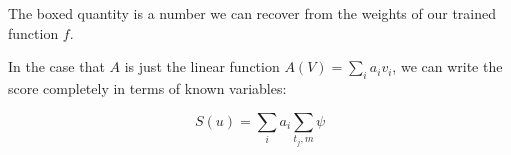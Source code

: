 \documentclass[paper.tex]{subfiles}
\begin{document}
	The boxed quantity is a number we can recover from the weights of our trained function $f$. 
	
	In the case that $A$ is just the linear function $A(V) = \sum_i a_i v_i$, we can write the score completely in terms of known variables:
	
	\begin{equation}
		S(u) = \sum_i a_i \sum_{t_j, m} \psi 
	\end{equation}
	
\end{document}
